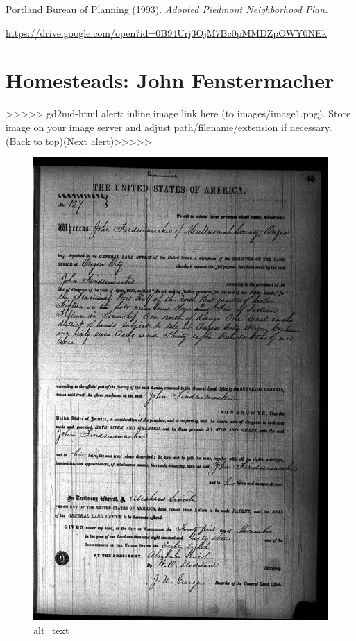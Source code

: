 \documentclass[
  12pt,
]{book}
\begin{document}
Portland Bureau of Planning (1993). \emph{Adopted Piedmont Neighborhood Plan.}

\url{https://drive.google.com/open?id=0B94Urj3OjM7Bc0pMMDZpOWY0NEk}

\hypertarget{homesteads-john-fenstermacher}{%
\section{Homesteads: John Fenstermacher}\label{homesteads-john-fenstermacher}}

{\textgreater\textgreater\textgreater\textgreater\textgreater{} gd2md-html alert: inline image link here (to images/image1.png). Store image on your image server and adjust path/filename/extension if necessary. }(Back to top)(Next alert){\textgreater\textgreater\textgreater\textgreater\textgreater{} }

\begin{figure}
\centering
\includegraphics{images/0204a_images/image1.png}
\caption{alt\_text}
\end{figure}
\end{document}
